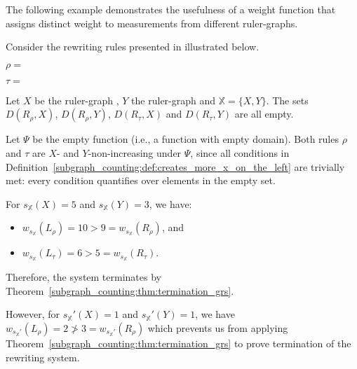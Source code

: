 The following example demonstrates the usefulness of a weight function that assigns distinct weight to measurements from different ruler-graphs.
\begin{example} 
    \label{ex:overbeek_5d6}
    Consider the rewriting rules presented in \cite[Example 5.6]{overbeek2024termination_lmcs} illustrated 
    below.
    \begin{center}
        \begin{center} 
          $\rho\mathop{=}$
        \end{center}
        \begin{center}
        $\tau\mathop{=}$
        \end{center}
      \end{center}
     Let $X$ be the ruler-graph
    , $Y$ the ruler-graph 
     and $\mathbb{X}\mathop{=}\{X, Y\}$.
    The sets $D(R_\rho, X)$, $D(R_\rho, Y)$, $D(R_\tau, X)$ and $D(R_\tau, Y)$ are all empty. 
    
    Let $\Psi$ be the empty function (i.e., a function with empty domain).
    Both rules $\rho$ and $\tau$ are $X$- and $Y$-non-increasing under $\Psi$,
    since all conditions in Definition~\ref{subgraph_counting:def:creates_more_x_on_the_left} are trivially met: every condition quantifies over elements in the empty set.
    
    For $s_\mathbb{X}(X)\mathop{=}5$ and $s_\mathbb{X}(Y)\mathop{=}3$, we have:
    \begin{itemize}
       \item $w_{s_\mathbb{X}}(L_\rho)\mathop{=}10\mathop{>}9\mathop{=}w_{s_\mathbb{X}}(R_\rho)$, and
       \item $w_{s_\mathbb{X}}(L_\tau)\mathop{=}6\mathop{>}5\mathop{=}w_{s_\mathbb{X}}(R_\tau)$.
    \end{itemize}
    Therefore, the system terminates by Theorem~\ref{subgraph_counting:thm:termination_grs}.

  However, for $s_\mathbb{X}'(X)\mathop{=}1$ and $s_\mathbb{X}'(Y)\mathop{=}1$, we have
    \(
        w_{s_\mathbb{X}'}(L_\rho)\mathop{=}2   \ngtr 3\mathop{=}w_{s_\mathbb{X}'}(R_\rho)
    \) which prevents us from applying Theorem~\ref{subgraph_counting:thm:termination_grs} to prove termination of the rewriting system.
\end{example}

